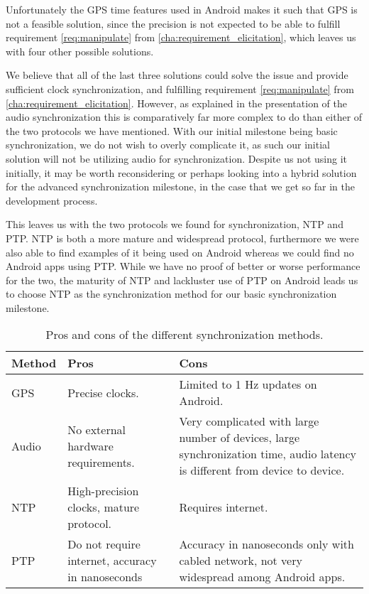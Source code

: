 Unfortunately the GPS time features used in Android makes it such that GPS is not a feasible solution, since the precision is not expected to be able to fulfill requirement \ref{req:manipulate} from \cref{cha:requirement_elicitation}, which leaves us with four other possible solutions.

We believe that all of the last three solutions could solve the issue and provide sufficient clock synchronization, and fulfilling requirement \ref{req:manipulate} from \cref{cha:requirement_elicitation}.
However, as explained in the presentation of the audio synchronization this is comparatively far more complex to do than either of the two protocols we have mentioned.
With our initial milestone being basic synchronization, we do not wish to overly complicate it, as such our initial solution will not be utilizing audio for synchronization.
Despite us not using it initially, it may be worth reconsidering or perhaps looking into a hybrid solution for the advanced synchronization milestone, in the case that we get so far in the development process.

This leaves us with the two protocols we found for synchronization, \ac{NTP} and \ac{PTP}.
\ac{NTP} is both a more mature and widespread protocol, furthermore we were also able to find examples of it being used on Android whereas we could find no Android apps using \ac{PTP}.
While we have no proof of better or worse performance for the two, the maturity of \ac{NTP} and lackluster use of \ac{PTP} on Android leads us to choose \ac{NTP} as the synchronization method for our basic synchronization milestone.

\begin{table}[ht]
    \begin{tabularx}{\textwidth}{lXX}\toprule
        \textbf{Method} & \textbf{Pros} & \textbf{Cons} \\ \midrule
        GPS     & Precise clocks. & Limited to 1 Hz updates on Android. \\
        Audio   & No external hardware requirements. & Very complicated with large number of devices, \newline large synchronization time, \newline audio latency is different from device to device. \\
        \ac{NTP} & High-precision clocks, \newline mature protocol. & Requires internet. \\
        \ac{PTP} & Do not require internet, \newline accuracy in nanoseconds & Accuracy in nanoseconds only with cabled network, \newline not very widespread among Android apps. \\ \bottomrule
    \end{tabularx}
    \caption{Pros and cons of the different synchronization methods.}\label{tab:pros_cons_sync}
\end{table}



